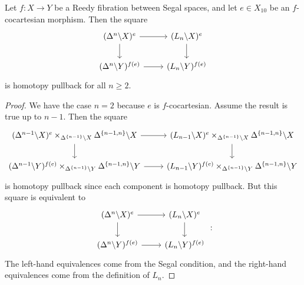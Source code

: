 \documentclass[main.tex]{subfiles}
\begin{document}
\begin{proposition}
  \label{prop:only_lowest_lifting_condition_is_necessary}
  Let $f\colon X \to Y$ be a Reedy fibration between Segal spaces, and let $e \in X_{10}$ be an $f$-cocartesian morphism. Then the square
  \begin{equation*}
    \begin{tikzcd}
      (\Delta^{n} \backslash X)^{e}
      \arrow[r]
      \arrow[d]
      & (L_{n} \backslash X)^{e}
      \arrow[d]
      \\
      (\Delta^{n} \backslash Y)^{f(e)}
      \arrow[r]
      & (L_{n} \backslash Y)^{f(e)}
    \end{tikzcd}
  \end{equation*}
  is homotopy pullback for all $n \geq 2$.
\end{proposition}
\begin{proof}
  We have the case $n = 2$ because $e$ is $f$-cocartesian. Assume the result is true up to $n - 1$. Then the square
  \begin{equation*}
    \begin{tikzcd}
      (\Delta^{n-1} \backslash X)^{e} \times_{\Delta^{\{n-1\}} \backslash X} \Delta^{\{n-1, n\}} \backslash X
      \arrow[r]
      \arrow[d]
      & (L_{n-1} \backslash X)^{e} \times_{\Delta^{\{n-1\}} \backslash X} \Delta^{\{n-1, n\}} \backslash X
      \arrow[d]
      \\
      (\Delta^{n-1} \backslash Y)^{f(e)} \times_{\Delta^{\{n-1\}} \backslash Y} \Delta^{\{n-1, n\}} \backslash Y
      \arrow[r]
      & (L_{n-1} \backslash Y)^{f(e)} \times_{\Delta^{\{n-1\}} \backslash Y} \Delta^{\{n-1, n\}} \backslash Y
    \end{tikzcd}
  \end{equation*}
  is homotopy pullback since each component is homotopy pullback. But this square is equivalent to
  \begin{equation*}
    \begin{tikzcd}
      (\Delta^{n} \backslash X)^{e}
      \arrow[r]
      \arrow[d]
      & (L_{n} \backslash X)^{e}
      \arrow[d]
      \\
      (\Delta^{n} \backslash Y)^{f(e)}
      \arrow[r]
      & (L_{n} \backslash Y)^{f(e)}
    \end{tikzcd}:
  \end{equation*}
  The left-hand equivalences come from the Segal condition, and the right-hand equivalences come from the definition of $L_{n}$.
\end{proof}
\end{document}
